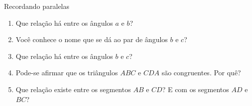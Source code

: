 \begin{task}{Recordando paralelas}
\begin{enumerate}
\item {} 
Que relação há entre os ângulos \(a\) e \(b\)?

\item {} 
Você conhece o nome que se dá ao par de ângulos \(b\) e \(c\)?

\item {} 
Que relação há entre os ângulos \(b\) e \(c\)?

\item {} 
Pode-se afirmar que os triângulos \(ABC\) e \(CDA\) são congruentes. Por quê?

\item {} 
Que relação existe entre os segmentos \(AB\) e \(CD\)? E com os segmentos \(AD\) e \(BC\)?

\end{enumerate}
\end{task}


\clearpage

